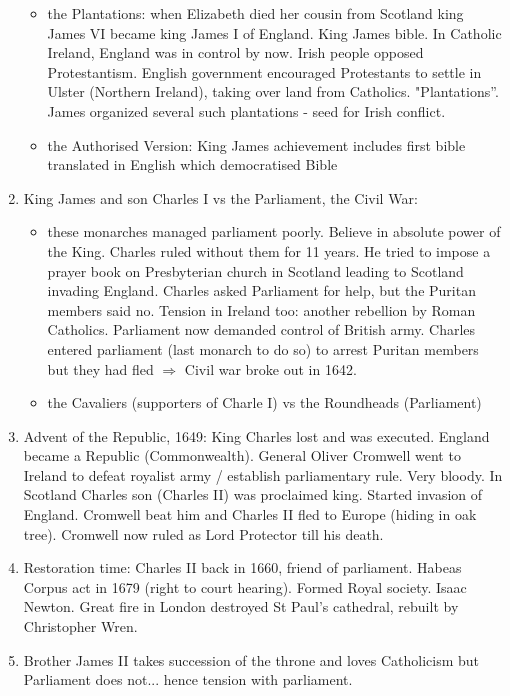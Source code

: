 \documentclass{amsart}
\begin{document}
\begin{enumerate}
		\begin{itemize} 	
			\item the Plantations: when Elizabeth died her cousin from Scotland king James VI became king James I of England. King James bible. 
In Catholic Ireland, England was in control by now. Irish people opposed Protestantism. English government encouraged Protestants to settle in Ulster (Northern Ireland), taking over land from Catholics. "Plantations''. James organized several such plantations - seed for Irish conflict.
			\item the Authorised Version: King James achievement includes first bible translated in English which democratised Bible
		\end{itemize}
	\item King James and son Charles I vs the Parliament, the Civil War: 
			\begin{itemize}
				\item these monarches managed parliament poorly. Believe in absolute power of the King. Charles ruled without them for 11 years. He tried to impose a prayer book on Presbyterian church in Scotland leading to Scotland invading England.  Charles asked Parliament for help, but the Puritan members said no. Tension in Ireland too: another rebellion by Roman Catholics. Parliament now demanded control of British army. Charles entered parliament (last monarch to do so) to arrest Puritan members but they had fled $\Rightarrow$ Civil war broke out in 1642. 
				\item the Cavaliers (supporters of Charle I) vs the Roundheads (Parliament)
		\end{itemize}				
	\item Advent of the Republic, 1649: King Charles lost and was executed. England became a Republic (Commonwealth). General Oliver Cromwell went to Ireland to defeat royalist army / establish parliamentary rule. Very bloody. In Scotland Charles son (Charles II) was proclaimed king. Started invasion of England. Cromwell beat him and Charles II fled to Europe (hiding in oak tree). Cromwell now ruled as Lord Protector till his death. 
\item Restoration time: Charles II back in 1660, friend of parliament. Habeas Corpus act in 1679 (right to court hearing). Formed Royal society. Isaac Newton.  Great fire in London destroyed St Paul's cathedral, rebuilt by Christopher Wren.
\item Brother James II takes succession of the throne and loves Catholicism but Parliament does not... hence tension with parliament.

\end{enumerate}
\end{document}
